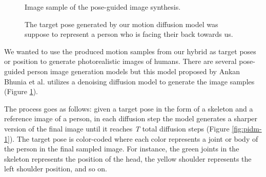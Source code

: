 \documentclass[10pt,twocolumn,letterpaper]{article}
\begin{document}
\begin{figure}[H]
    \centering

    \caption{Image sample of the pose-guided image synthesis.}
    \label{fig:pidm-0}
\end{figure}

\begin{figure}[h!]
    \centering

    \caption{The target pose generated by our motion diffusion model was suppose to represent a 
    person who is facing their back towards us.}
    \label{fig:pidm-2}
\end{figure}


We wanted to use the produced motion samples from our hybrid as target poses or position to generate 
photorealistic images of humans. There are several pose-guided person image generation
models but this model proposed by Ankan Bhunia et al. \cite{Bhunia23} utilizes a denoising diffusion model to
generate the image samples (Figure \ref{fig:pidm-0}).

The process goes as follows: given a target pose in the form of a skeleton and a reference image 
of a person, in each diffusion step the model generates a sharper version of the final image until it
reaches \emph{T} total diffusion steps (Figure \ref{fig:pidm-1}). The target pose is color-coded where
each color represents a joint or body of the person in the final sampled image. For instance, the green 
joints in the skeleton represents the position of the head, the yellow shoulder represents the left shoulder 
position, and so on.
\end{document}
